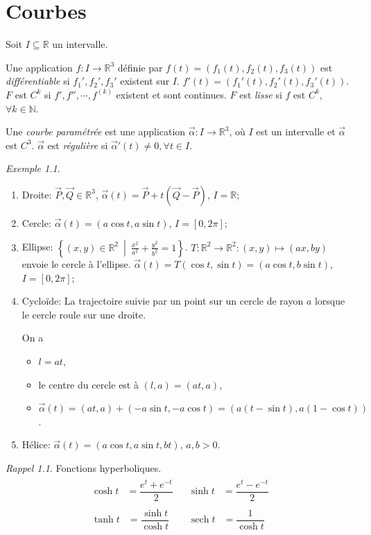 \documentclass{report}
\theoremstyle{definition}
\theoremstyle{remark}
\newtheorem*{exem}{Exemple}
\newtheorem*{rapp}{Rappel}
\def\NN{\mathbb{N}}
\def\RR{\mathbb{R}}
\def\sech{\operatorname{sech}}
\begin{document}
	\chapter{Courbes}
	Soit $I \subseteq \RR$ un intervalle.

	Une application $f:I \to \RR^3$ d\'efinie par $f(t) = (f_1(t), f_2(t), f_3(t))$ est \emph{diff\'erentiable} si $f_1',f_2',f_3'$ existent sur $I$. $f'(t) = (f_1'(t), f_2'(t), f_3'(t))$. $F$ est $C^k$ si $f', f'', \cdots, f^{(k)}$ existent et sont continues. $F$ est \emph{lisse} si $f$ est $C^k$, $\forall k\in \NN$.

	Une \emph{courbe param\'etr\'ee} est une application $\vec\alpha:I \to \RR^3$, o\`u $I$ est un intervalle et $\vec\alpha$ est $C^3$. $\vec\alpha$ est \emph{r\'eguli\`ere} si $\vec\alpha'(t)\neq0, \forall t\in I$.

	\begin{exem}
		\begin{enumerate}
			\item Droite: $\vec P,\vec Q \in \RR^3$, $\vec\alpha(t) = \vec P + t(\vec Q-\vec P)$, $I=\RR$;
			\item Cercle: $\vec\alpha(t) = (a\cos t,a\sin t)$, $I=[0,2\pi]$;
			\item Ellipse: $\left\{ (x,y)\in\RR^2 ~\middle|~ \frac{x^2}{a^2}+\frac{y^2}{b^2}=1 \right\}$. $T : \RR^2\to\RR^2 : (x,y)\mapsto(ax,by)$ envoie le cercle \`a l'ellipse. $\vec\alpha(t) = T(\cos t,\sin t) = (a\cos t,b\sin t)$, $I=[0,2\pi]$;
			\item Cyclo\"ide: La trajectoire suivie par un point sur un cercle de rayon $a$ lorsque le cercle roule sur une droite.

			On a
			\begin{itemize}
				\item $l=at$,
				\item le centre du cercle est \`a $(l,a)=(at,a)$,
				\item $\vec\alpha(t) = (at,a)+(-a\sin t,-a\cos t) = (a(t-\sin t), a(1-\cos t))$.
			\end{itemize}
			\item H\'elice: $\vec\alpha(t) = (a\cos t, a\sin t, bt)$, $a,b>0$.
		\end{enumerate}
	\end{exem}

	\begin{rapp}
		Fonctions hyperboliques.
		\begin{align*}
			\begin{split}
				\cosh t&= \dfrac{e^t+e^{-t}}{2}
			\end{split}
			&
			\begin{split}
				\sinh t&= \dfrac{e^t-e^{-t}}{2}
			\end{split}
			\\[2ex]
			\begin{split}
				\tanh t&= \dfrac{\sinh t}{\cosh t}
			\end{split}
			&
			\begin{split}
				\sech t&= \dfrac{1}{\cosh t}
			\end{split}
		\end{align*}
	\end{rapp}
\end{document}
